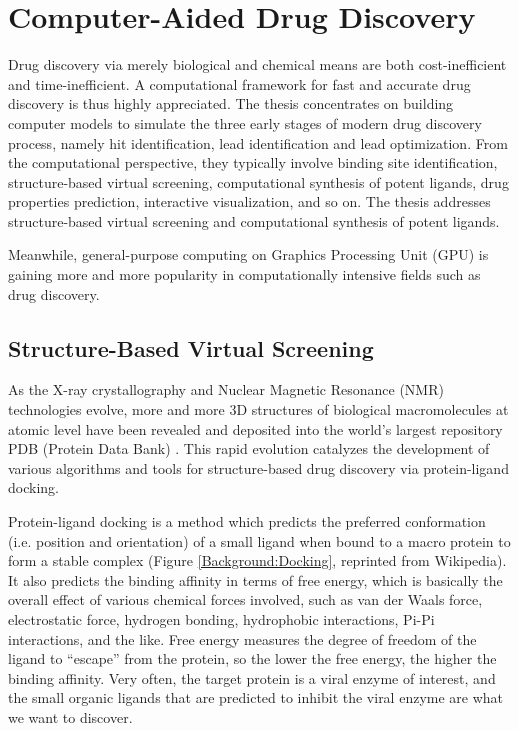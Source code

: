 \chapter{Computer-Aided Drug Discovery}

Drug discovery via merely biological and chemical means are both cost-inefficient and time-inefficient. A computational framework for fast and accurate drug discovery is thus highly appreciated. The thesis concentrates on building computer models to simulate the three early stages of modern drug discovery process, namely hit identification, lead identification and lead optimization. From the computational perspective, they typically involve binding site identification, structure-based virtual screening, computational synthesis of potent ligands, drug properties prediction, interactive visualization, and so on. The thesis addresses structure-based virtual screening and computational synthesis of potent ligands.

Meanwhile, general-purpose computing on Graphics Processing Unit (GPU) is gaining more and more popularity in computationally intensive fields such as drug discovery.

\section{Structure-Based Virtual Screening}

As the X-ray crystallography and Nuclear Magnetic Resonance (NMR) technologies evolve, more and more 3D structures of biological macromolecules at atomic level have been revealed and deposited into the world's largest repository PDB (Protein Data Bank) \citep{540,537}. This rapid evolution catalyzes the development of various algorithms and tools for structure-based drug discovery via protein-ligand docking.

Protein-ligand docking is a method which predicts the preferred conformation (i.e. position and orientation) of a small ligand when bound to a macro protein to form a stable complex (Figure \ref{Background:Docking}, reprinted from Wikipedia). It also predicts the binding affinity in terms of free energy, which is basically the overall effect of various chemical forces involved, such as van der Waals force, electrostatic force, hydrogen bonding, hydrophobic interactions, Pi-Pi interactions, and the like. Free energy measures the degree of freedom of the ligand to ``escape'' from the protein, so the lower the free energy, the higher the binding affinity. Very often, the target protein is a viral enzyme of interest, and the small organic ligands that are predicted to inhibit the viral enzyme are what we want to discover.

